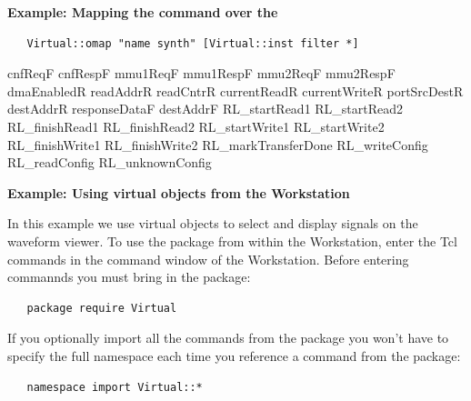 {\bf Example: Mapping the  command over the }

\begin{verbatim}
   Virtual::omap "name synth" [Virtual::inst filter *]
\end{verbatim}
\begin{codebox}
cnfReqF cnfRespF mmu1ReqF mmu1RespF mmu2ReqF mmu2RespF dmaEnabledR
readAddrR readCntrR currentReadR currentWriteR portSrcDestR destAddrR
responseDataF destAddrF RL_startRead1 RL_startRead2 RL_finishRead1
RL_finishRead2 RL_startWrite1 RL_startWrite2 RL_finishWrite1
RL_finishWrite2 RL_markTransferDone RL_writeConfig RL_readConfig
RL_unknownConfig 
\end{codebox}

{\bf Example: Using  virtual objects from the Workstation}

In this example we use  virtual objects to select and display
signals on the waveform viewer.
To use the  package from within the Workstation, enter the Tcl
 commands in the command window of the Workstation.   Before entering
 commannds you must bring in the  package:

\begin{verbatim}
   package require Virtual
\end{verbatim}

If you optionally import all the commands from the   package you
won't have to specify the full namespace each time you reference a
command from the package:

\begin{verbatim}
   namespace import Virtual::*
\end{verbatim}


